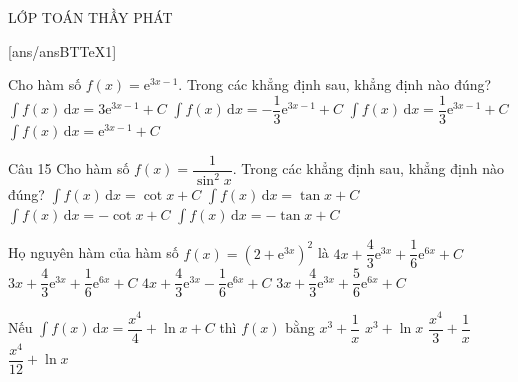\begin{name}
{\tenchude}{\tendethi}{LỚP TOÁN THẦY PHÁT}{\thoigian}
\end{name}
[ans/ansBTTeX1]
\begin{ex}%
Cho hàm số $f(x)=\mathrm{e}^{3x-1}$. Trong các khẳng định sau, khẳng định nào đúng?
\choice
{$\displaystyle\int f(x) \mathrm{\,d}x=3 \mathrm{e}^{3x-1}+C$}
{$\displaystyle\int f(x) \mathrm{\,d}x=-\dfrac{1}{3} \mathrm{e}^{3x-1}+C$}
{\True $\displaystyle\int f(x) \mathrm{\,d}x=\dfrac{1}{3} \mathrm{e}^{3x-1}+C$}
{$\displaystyle\int f(x) \mathrm{\,d}x=\mathrm{e}^{3x-1}+C$}
\end{ex}

\begin{ex}Câu 15%
Cho hàm số $f(x)=\dfrac{1}{\sin^2x}$. Trong các khẳng định sau, khẳng định nào đúng?
\choice
{$\displaystyle\int f(x)\mathrm{\,d}x=\cot x+C$}
{$\displaystyle\int f(x)\mathrm{\,d}x=\tan x+C$}
{\True $\displaystyle\int f(x)\mathrm{\,d}x=-\cot x+C$}
{$\displaystyle\int f(x)\mathrm{\,d}x=-\tan x+C$}
\end{ex}

\begin{ex}%
Họ nguyên hàm của hàm số $f(x)=(2+\mathrm{e}^{3x})^2$ là
\choice
{\True $4 x+\dfrac{4}{3} \mathrm{e}^{3x}+\dfrac{1}{6} \mathrm{e}^{6 x}+C$}
{$3x+\dfrac{4}{3} \mathrm{e}^{3x}+\dfrac{1}{6} \mathrm{e}^{6 x}+C$}
{$4 x+\dfrac{4}{3} \mathrm{e}^{3x}-\dfrac{1}{6} \mathrm{e}^{6 x}+C$}
{$3x+\dfrac{4}{3} \mathrm{e}^{3x}+\dfrac{5}{6} \mathrm{e}^{6 x}+C$}
\end{ex}

\begin{ex}%
Nếu $\displaystyle\int f(x)\mathrm{\,d}x=\dfrac{x^{4}}{4}+\ln x+C$ thì $f(x)$ bằng
\choice
{\True $x^3+\dfrac{1}{x}$}
{$x^3+\ln x$}
{$\dfrac{x^{4}}{3}+\dfrac{1}{x}$}
{$\dfrac{x^{4}}{12}+\ln x$}
\end{ex}

